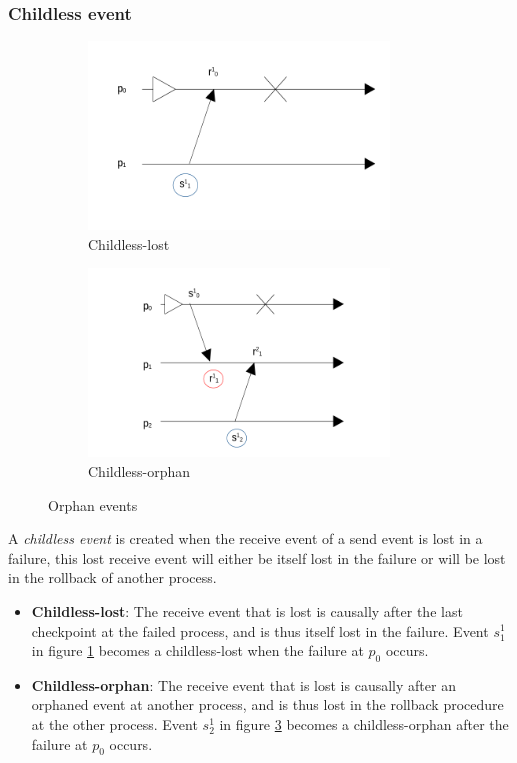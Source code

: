 \documentclass[twocolumn, a4paper,11pt]{article}%
\begin{document}
\subsubsection{Childless event}
\begin{figure}[h]
	\centering
	\begin{subfigure}{8cm}
		\centering
		\includegraphics[width=8cm]{Childless_lost.png}
		\caption{Childless-lost}
		\label{fig:childless_lost}
	\end{subfigure}
	\begin{subfigure}{8cm}
		\centering
		\includegraphics[width=8cm]{Childless_orphan.png}
		\caption{Childless-orphan}
		\label{fig:childless_orphan}
	\end{subfigure}
	\caption{Orphan events}
\end{figure}
\par A \textit{childless event} is created when the receive event of a send event is lost in a failure,  this lost receive event will either be itself lost in the failure or will be lost in the rollback of another process. 
\begin{itemize}
	\item \textbf{Childless-lost}: The receive event that is lost is causally after the last checkpoint at the failed process, and is thus itself lost in the failure. Event \(s^{1}_{1}\) in figure \ref{fig:childless_lost} becomes a childless-lost when the failure at \(p_{0}\) occurs.
	\item \textbf{Childless-orphan}: The receive event that is lost is causally after an orphaned event at another process, and is thus lost in the rollback procedure at the other process. Event \(s^{1}_{2}\) in figure \ref{fig:childless_orphan} becomes a childless-orphan after the failure at \(p_{0}\) occurs.
\end{itemize}
\end{document}
